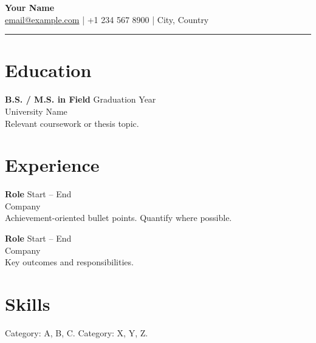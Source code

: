 \documentclass[11pt,a4paper]{article}
\begin{document}
\begin{center}
{\LARGE \textbf{Your Name}}\\[0.3em]
\href{mailto:email@example.com}{email@example.com} \quad | \quad +1 234 567 8900 \quad | \quad City, Country
\end{center}

\begin{flushright}\rule{2cm}{2.5cm}\end{flushright}
\vspace{0.6em}
\section*{Education}
\textbf{B.S. / M.S. in Field} \hfill Graduation Year \\
University Name \\
Relevant coursework or thesis topic.

\section*{Experience}
\textbf{Role} \hfill Start -- End \\
Company \\
Achievement-oriented bullet points. Quantify where possible.

\textbf{Role} \hfill Start -- End \\
Company \\
Key outcomes and responsibilities.

\section*{Skills}
Category: A, B, C. \quad Category: X, Y, Z.
\end{document}
